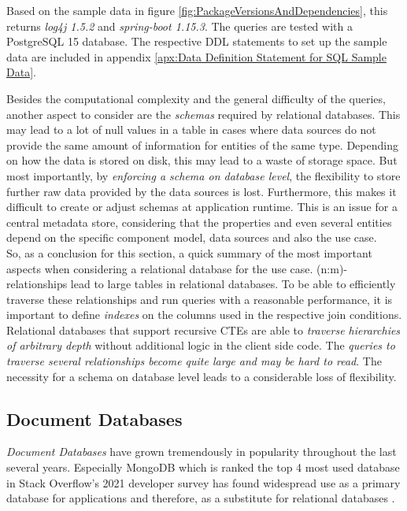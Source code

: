 Based on the sample data in figure \ref{fig:PackageVersionsAndDependencies}, this returns \emph{log4j 1.5.2} and \emph{spring-boot 1.15.3}. The queries are tested with a PostgreSQL 15 database. The respective DDL %
statements to set up the sample data are included in appendix \ref{apx:Data Definition Statement for SQL Sample Data}.\par
Besides the computational complexity and the general difficulty of the queries, another aspect to consider are the \emph{schemas} required by relational databases. This may lead to a lot of null values in a table in cases where data sources do not provide the same amount of information for entities of the same type. Depending on how the data is stored on disk, this may lead to a waste of storage space. But most importantly, by \emph{enforcing a schema on database level}, the flexibility to store further raw data provided by the data sources is lost. Furthermore, this makes it difficult to create or adjust schemas at application runtime. This is an issue for a central metadata store, considering that the properties and even several entities depend on the specific component model, data sources and also the use case.\\

So, as a conclusion for this section, a quick summary of the most important aspects when considering a relational database for the use case. 
(n:m)-relationships lead to large tables in relational databases. To be able to efficiently traverse these relationships and run queries with a reasonable performance, it is important to define \emph{indexes} on the columns used in the respective join conditions. Relational databases that support recursive CTEs are able to \emph{traverse hierarchies of arbitrary depth} without additional logic in the client side code. The \emph{queries to traverse several relationships become quite large and may be hard to read}. The necessity for a schema on database level leads to a considerable loss of flexibility. 
 
\subsection{Document Databases}
\emph{Document Databases} have grown tremendously in popularity throughout the last several years. Especially MongoDB which is ranked the top 4 most used database in Stack Overflow's 2021 developer survey has found widespread use as a primary database for applications and therefore, as a substitute for relational databases \cite{StackoverflowDeveloperSurvey}.

